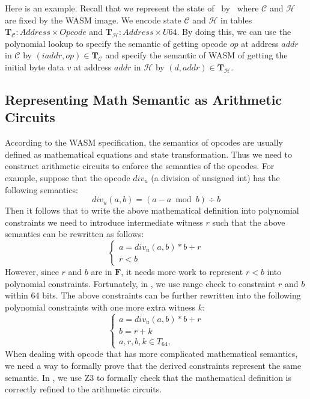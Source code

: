 Here is an example. Recall that we represent the state of \zkwasm\, by \fullstate \, where $\mathcal{C}$ and $\mathcal{H}$ are fixed by the WASM image. We encode state $\mathcal{C}$ and $\mathcal{H}$ in tables $\mathbf{T}_\mathcal{C} : Address \times Opcode$ and $\mathbf{T}_\mathcal{H}: Address \times U64$. By doing this, we can use the polynomial lookup to specify the semantic of getting opcode $op$ at address $addr$ in $\mathcal{C}$ by $(iaddr, op) \in \mathbf{T}_\mathcal{C}$ and specify the semantic of WASM of getting the initial byte data $v$ at address $addr$ in $\mathcal{H}$ by $(d, addr) \in \mathbf{T}_\mathcal{H}$.

\subsection{Representing Math Semantic as Arithmetic Circuits}
According to the WASM specification, the semantics of opcodes are usually defined as mathematical equations and state transformation. Thus we need to construct arithmetic circuits to enforce the semantics of the opcodes. For example, suppose that the opcode $div_u$ (a division of unsigned int) has the following semantics:
\[ div_u(a, b) = (a - a \bmod b) \div b \] 
Then it follows that to write the above mathematical definition into polynomial constraints we need to introduce intermediate witness $r$ such that the above semantics can be rewritten as follows:
\begin{equation}
\begin{cases}
    a = div_u(a,b) * b + r \\
    r < b
\end{cases}
\end{equation}
However, since $r$ and $b$ are in $\mathbf{F}$, it needs more work to represent $r < b$ into polynomial constraints. Fortunately, in \zkwasm, we use range check to constraint $r$ and $b$ within 64 bits. The above constraints can be further rewritten into the following polynomial constraints with one more extra witness $k$: 
\begin{equation}
\begin{cases}
    a = div_u(a,b) * b + r \\
    b = r + k \\
    a, r, b, k\in T_{64}, 
\end{cases}
\end{equation}
When dealing with opcode that has more complicated mathematical semantics, we need a way to formally prove that the derived constraints represent the same semantic. In \zkwasm, we use Z3 to formally check that the mathematical definition is correctly refined to the arithmetic circuits.

